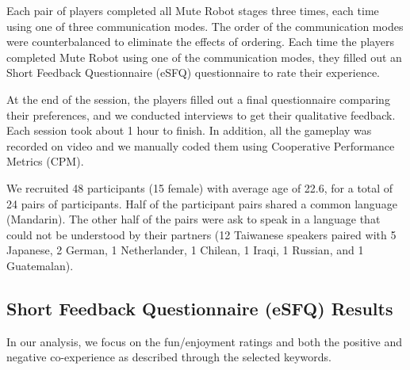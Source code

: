 Each pair of players completed all Mute Robot stages three times, each time using one of three communication modes. The order of the communication modes were counterbalanced to eliminate the effects of ordering.
Each time the players completed Mute Robot using one of the communication modes, they filled out an Short Feedback Questionnaire (eSFQ)\cite{eSFQ} questionnaire to rate their experience. 

At the end of the session, the players filled out a final questionnaire comparing their preferences, and we conducted interviews to get their qualitative feedback. Each session took about 1 hour to finish. 
In addition, all the gameplay was recorded on video and we manually coded them using Cooperative Performance Metrics (CPM)\cite{CPMs}. 

We recruited 48 participants (15 female) with average age of 22.6, for a total of 24 pairs of participants. Half of the participant pairs shared a common language (Mandarin). The other half of the pairs were ask to speak in a language that could not be understood by their partners (12 Taiwanese speakers paired with 5 Japanese, 2 German, 1 Netherlander, 1 Chilean, 1 Iraqi, 1 Russian, and 1 Guatemalan).
  








\subsection{Short Feedback Questionnaire (eSFQ) Results}
In our analysis, we focus on the fun/enjoyment ratings and both the positive and negative co-experience as described through the selected keywords. 

